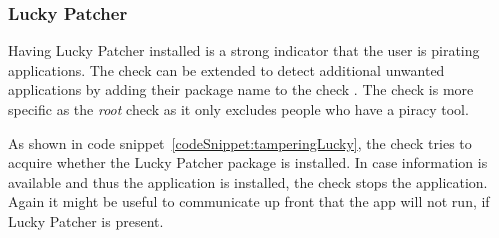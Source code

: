 \subsubsection{Lucky Patcher} \label{subsection:counter-improve-tampering-luckypatcher}
Having Lucky Patcher installed is a strong indicator that the user is pirating applications.
The check can be extended to detect additional unwanted applications by adding their package name to the check \cite{androidCrackingTools}.
The check is more specific as the \textit{root} check as it only excludes people who have a piracy tool.
\newline

As shown in code snippet~\ref{codeSnippet:tamperingLucky}, the check tries to acquire whether the Lucky Patcher package is installed.
In case information is available and thus the application is installed, the check stops the application.
Again it might be useful to communicate up front that the app will not run, if Lucky Patcher is present.
